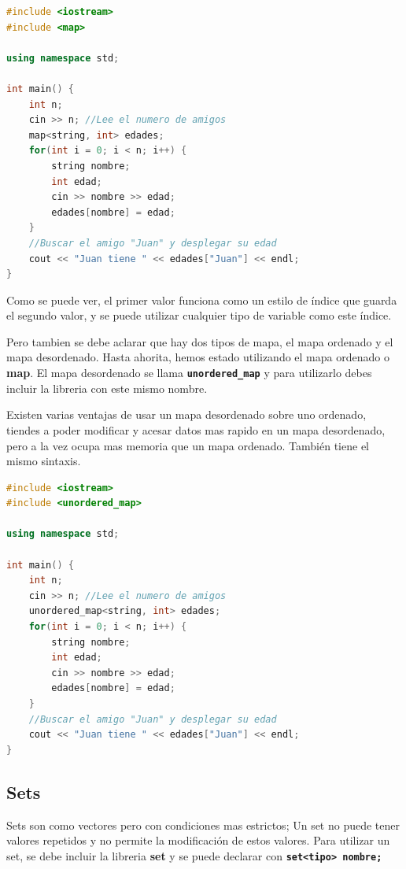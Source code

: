 \documentclass{article}
\begin{document}
\begin{lstlisting}[language=C++, caption=Implementación con map]
#include <iostream>
#include <map>

using namespace std;

int main() {
    int n;
    cin >> n; //Lee el numero de amigos
    map<string, int> edades;
    for(int i = 0; i < n; i++) {
        string nombre;
        int edad;
        cin >> nombre >> edad;
        edades[nombre] = edad;
    }
    //Buscar el amigo "Juan" y desplegar su edad
    cout << "Juan tiene " << edades["Juan"] << endl;
}
\end{lstlisting}

Como se puede ver, el primer valor funciona como un estilo de índice que guarda el segundo valor, y se puede utilizar cualquier tipo de variable como este índice.

Pero tambien se debe aclarar que hay dos tipos de mapa, el mapa ordenado y el mapa desordenado. Hasta ahorita, hemos estado utilizando el mapa ordenado o \textbf{map}. El mapa desordenado se llama \textbf{\lstinline{unordered_map}} y para utilizarlo debes incluir la libreria con este mismo nombre.

Existen varias ventajas de usar un mapa desordenado sobre uno ordenado, tiendes a poder modificar y acesar datos mas rapido en un mapa desordenado, pero a la vez ocupa mas memoria que un mapa ordenado. También tiene el mismo sintaxis.

\begin{lstlisting}[language=C++, caption=Mapa desordenado]
#include <iostream>
#include <unordered_map>

using namespace std;

int main() {
    int n;
    cin >> n; //Lee el numero de amigos
    unordered_map<string, int> edades;
    for(int i = 0; i < n; i++) {
        string nombre;
        int edad;
        cin >> nombre >> edad;
        edades[nombre] = edad;
    }
    //Buscar el amigo "Juan" y desplegar su edad
    cout << "Juan tiene " << edades["Juan"] << endl;
}
\end{lstlisting}

\subsection{Sets}

Sets son como vectores pero con condiciones mas estrictos; Un set no puede tener valores repetidos y no permite la modificación de estos valores. Para utilizar un set, se debe incluir la libreria \textbf{set} y se puede declarar con \textbf{\lstinline{set<tipo> nombre;}}
\end{document}
